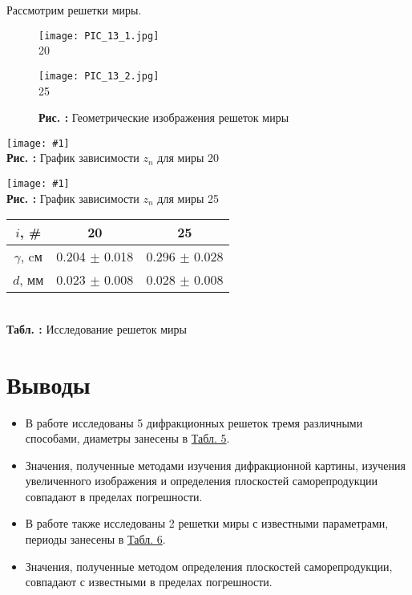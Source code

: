 \documentclass[12pt,a4paper]{article}
\newcounter{picture}
\newcounter{tbl}
\newcommand{\embedeps}[3]{\begin{center}
		\texttt{[image: \#1]}
		\\\textbf{Рис. \thepicture:} #3
		\label{pic_\thepicture}
		\addtocounter{picture}{1}
\end{center}}
\newcommand{\embedtbl}[3]{\begin{center}
		\begin{tabular}{#1}
			#2
		\end{tabular}
		\\\textbf{Табл. \thetbl:} #3
		\label{tbl_\thetbl}
		\addtocounter{tbl}{1}
\end{center}}
\newcommand{\tblref}[1]{\hyperref[tbl_#1]{Табл. #1}}
\begin{document}
	Рассмотрим решетки миры.
	
	\begin{figure}[h]
		\begin{minipage}{0.5\linewidth}
			\begin{center}
				\texttt{[image: PIC\_13\_1.jpg]}
				\\20
			\end{center}
		\end{minipage}
		\begin{minipage}{0.5\linewidth}
			\begin{center}
				\texttt{[image: PIC\_13\_2.jpg]}
				\\25
			\end{center}
		\end{minipage}
		\begin{center}
			\textbf{Рис. \thepicture:} Геометрические изображения решеток миры
			\label{pic_\thepicture}
			\addtocounter{picture}{1}
		\end{center}
	\end{figure}
	
	\embedeps{PIC_11.eps}{0.7}{График зависимости $z_n$ для миры 20}
	\embedeps{PIC_12.eps}{0.7}{График зависимости $z_n$ для миры 25}
	
	\embedtbl{|c|c|c|}{
		\hline
		$i$, \# & 20 & 25
		\\\hline
		$\gamma$, cм & 0.204 $\pm$ 0.018 & 0.296 $\pm$ 0.028
		\\\hline
		$d$, мм & 0.023 $\pm$ 0.008 & 0.028 $\pm$ 0.008
		\\\hline
	}{Исследование решеток миры}
	
	
	\section{Выводы}
	
	\begin{itemize}
		\item В работе исследованы 5 дифракционных решеток тремя различными способами, диаметры занесены в \tblref{5}.
		
		\item Значения, полученные методами изучения дифракционной картины, изучения увеличенного изображения и определения плоскостей саморепродукции совпадают в пределах погрешности.
		
		\item В работе также исследованы 2 решетки миры с известными параметрами, периоды занесены в \tblref{6}.
		
		\item Значения, полученные методом определения плоскостей саморепродукции, совпадают с известными в пределах погрешности.
	\end{itemize}
		
\end{document}
